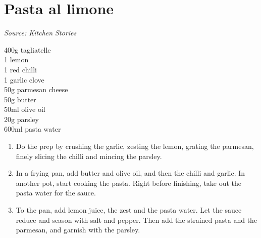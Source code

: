 \documentclass{report}
\begin{document}
\section{Pasta al limone}
\textit{Source: Kitchen Stories}\\
\begin{minipage}[t]{0.21\textwidth} \vspace{0pt}
400g tagliatelle\\
1 lemon\\
1 red chilli\\
1 garlic clove\\
50g parmesan cheese\\
50g butter\\
50ml olive oil\\
20g parsley\\
600ml pasta water
\end{minipage}
\hfill
\begin{minipage}[t]{0.78\textwidth} \vspace{0pt}
	\begin{enumerate}
		\item Do the prep by crushing the garlic, zesting the lemon, grating the parmesan, finely slicing the chilli and mincing the parsley.
		\item In a frying pan, add butter and olive oil, and then the chilli and garlic. In another pot, start cooking the pasta. Right before finishing, take out the pasta water for the sauce.
		\item To the pan, add lemon juice, the zest and the pasta water. Let the sauce reduce and season with salt and pepper. Then add the strained pasta and the parmesan, and garnish with the parsley.
	\end{enumerate}	
\end{minipage}
\end{document}
